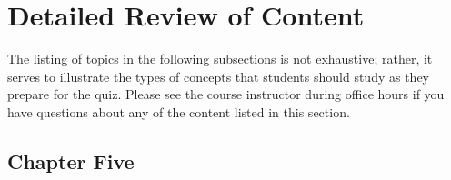 



\vspace*{-.15in}
\section*{Detailed Review of Content}
\vspace*{-.1in}

The listing of topics in the following subsections is not exhaustive; rather, it serves to illustrate the types of
concepts that students should study as they prepare for the quiz. Please see the course instructor during office hours
if you have questions about any of the content listed in this section.

\vspace*{-.15in}
\subsection*{Chapter Five}
\vspace*{-.15in}

